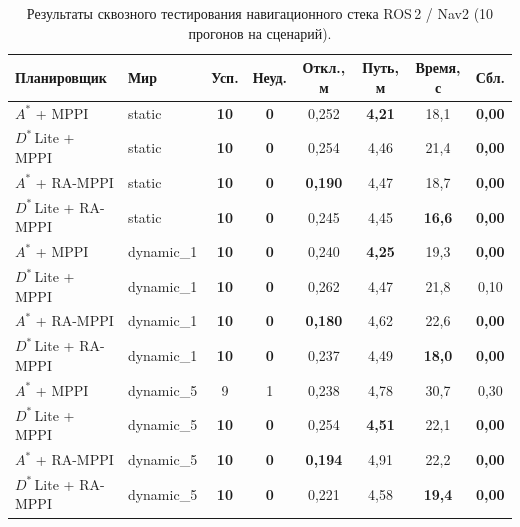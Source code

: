 \documentclass[a4paper,12pt]{extarticle}
\begin{document}
    \begin{table}[H]
        \centering
        \footnotesize
        \caption{Результаты сквозного тестирования навигационного стека ROS\,2 / Nav2 (10 прогонов на сценарий).}
        \label{tab:ros_full}
        \begin{tabular}{|l|l|c|c|c|c|c|c|}
            \hline
            \textbf{Планировщик} & \textbf{Мир} &
            \textbf{Усп.} & \textbf{Неуд.} &
            \textbf{Откл., м} & \textbf{Путь, м} & \textbf{Время, с} & \textbf{Сбл.} \\
            \hline
            $A^*$    + MPPI       & static      & \textbf{10} & \textbf{0} & 0{,}252 & \textbf{4{,}21} & 18{,}1 & \textbf{0{,}00} \\\hline
            $D^*$\,Lite + MPPI    & static      & \textbf{10} & \textbf{0} & 0{,}254 & 4{,}46 & 21{,}4 & \textbf{0{,}00} \\\hline
            $A^*$    + RA-MPPI    & static      & \textbf{10} & \textbf{0} & \textbf{0{,}190} & 4{,}47 & 18{,}7 & \textbf{0{,}00} \\\hline
            $D^*$\,Lite + RA-MPPI & static      & \textbf{10} & \textbf{0} & 0{,}245 & 4{,}45 & \textbf{16{,}6} & \textbf{0{,}00} \\\hline\hline
            $A^*$    + MPPI       & dynamic\_1  & \textbf{10} & \textbf{0} & 0{,}240 & \textbf{4{,}25} & 19{,}3 & \textbf{0{,}00} \\\hline
            $D^*$\,Lite + MPPI    & dynamic\_1  & \textbf{10} & \textbf{0} & 0{,}262 & 4{,}47 & 21{,}8 & 0{,}10 \\\hline
            $A^*$    + RA-MPPI    & dynamic\_1  & \textbf{10} & \textbf{0} & \textbf{0{,}180} & 4{,}62 & 22{,}6 & \textbf{0{,}00} \\\hline
            $D^*$\,Lite + RA-MPPI & dynamic\_1  & \textbf{10} & \textbf{0} & 0{,}237 & 4{,}49 & \textbf{18{,}0} & \textbf{0{,}00} \\\hline\hline
            $A^*$    + MPPI       & dynamic\_5  &  9 & 1 & 0{,}238 & 4{,}78 & 30{,}7 & 0{,}30 \\\hline
            $D^*$\,Lite + MPPI    & dynamic\_5  & \textbf{10} & \textbf{0} & 0{,}254 & \textbf{4{,}51} & 22{,}1 & \textbf{0{,}00} \\\hline
            $A^*$    + RA-MPPI    & dynamic\_5  & \textbf{10} & \textbf{0} & \textbf{0{,}194} & 4{,}91 & 22{,}2 & \textbf{0{,}00} \\\hline
            $D^*$\,Lite + RA-MPPI & dynamic\_5  & \textbf{10} & \textbf{0} & 0{,}221 & 4{,}58 & \textbf{19{,}4} & \textbf{0{,}00} \\\hline\hline

\end{tabular}
\end{table}
\end{document}
